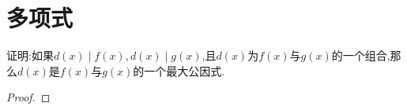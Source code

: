 \section{多项式}
\begin{problem}
    证明:如果$d(x)\mid f(x),d(x)\mid g(x)$,且$d(x)$为$f(x)$与$g(x)$的一个组合,那么$d(x)$是$f(x)$与$g(x)$的一个最大公因式.
\end{problem}
\begin{proof}
    
\end{proof}